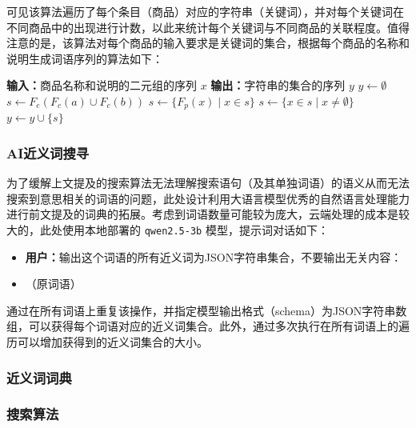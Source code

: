 可见该算法遍历了每个条目（商品）对应的字符串（关键词），并对每个关键词在不同商品中的出现进行计数，以此来统计每个关键词与不同商品的关联程度。值得注意的是，该算法对每个商品的输入要求是关键词的集合，根据每个商品的名称和说明生成词语序列的算法如下：

\vspace{1em}
\begin{algorithmic}
	\STATE \textbf{输入：}商品名称和说明的二元组的序列 $x$
	\STATE \textbf{输出：}字符串的集合的序列 $y$
	\STATE $y \gets \emptyset$
		\STATE $s \gets F_e(F_c(a) \cup F_c(b))$
		\STATE $s \gets \{F_p(x) \mid x \in s\}$
		\STATE $s \gets \{x \in s \mid x \neq \emptyset\}$
		\STATE $y \gets y \cup \{s\}$
	\ENDFOR
\end{algorithmic}

\subsubsection{AI近义词搜寻}

为了缓解上文提及的搜索算法无法理解搜索语句（及其单独词语）的语义从而无法搜索到意思相关的词语的问题，此处设计利用大语言模型优秀的自然语言处理能力进行前文提及的词典的拓展。考虑到词语数量可能较为庞大，云端处理的成本是较大的，此处使用本地部署的 \verb|qwen2.5-3b| 模型，提示词对话如下：

\begin{itemize}
	\item[] \textbf{用户：}输出这个词语的所有近义词为JSON字符串集合，不要输出无关内容：
	\item[]（原词语）
\end{itemize}

通过在所有词语上重复该操作，并指定模型输出格式（schema）为JSON字符串数组，可以获得每个词语对应的近义词集合。此外，通过多次执行在所有词语上的遍历可以增加获得到的近义词集合的大小。

\subsubsection{近义词词典}

\subsubsection{搜索算法}